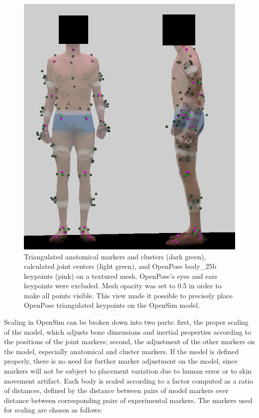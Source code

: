 \begin{figure}[!ht]
	\centering
	\def\svgwidth{1\columnwidth}
	\fontsize{10pt}{10pt}\selectfont
	\includegraphics[width=\linewidth]{"../Chap3/Figures/Fig_MkMkl.png"}
	\caption{Triangulated anatomical markers and clusters (dark green), calculated joint centers (light green), and OpenPose body\_25b keypoints (pink) on a textured mesh. OpenPose’s eyes and ears keypoints were excluded. Mesh opacity was set to 0.5 in order to make all points visible. This view made it possible to precisely place OpenPose triangulated keypoints on the OpenSim model.}
	\label{fig_mkmkl}
\end{figure}

Scaling in OpenSim can be broken down into two parts: first, the proper scaling of the model, which adjusts bone dimensions and inertial properties according to the positions of the joint markers; second, the adjustment of the other markers on the model, especially anatomical and cluster markers. If the model is defined properly, there is no need for further marker adjustment on the model, since markers will not be subject to placement variation due to human error or to skin movement artifact. Each body is scaled according to a factor computed as a ratio of distances, defined by the distance between pairs of model markers over distance between corresponding pairs of experimental markers. The markers used for scaling are chosen as follows:

